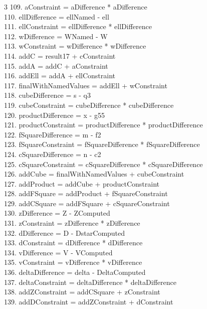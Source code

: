 \documentclass[10pt]{article}
\begin{document}
\begin{multicols}{3}
109. aConstraint = aDifference * aDifference\\
110. ellDifference = ellNamed - ell\\
111. ellConstraint = ellDifference * ellDifference\\
112. wDifference = WNamed - W\\
113. wConstraint = wDifference * wDifference\\
114. addC = result17 + cConstraint\\
115. addA = addC + aConstraint\\
116. addEll = addA + ellConstraint\\
117. finalWithNamedValues = addEll + wConstraint\\
118. cubeDifference = s - q3\\
119. cubeConstraint = cubeDifference * cubeDifference\\
120. productDifference = x - g55\\
121. productConstraint = productDifference * productDifference\\
122. fSquareDifference = m - f2\\
123. fSquareConstraint = fSquareDifference * fSquareDifference\\
124. cSquareDifference = n - c2\\
125. cSquareConstraint = cSquareDifference * cSquareDifference\\
126. addCube = finalWithNamedValues + cubeConstraint\\
127. addProduct = addCube + productConstraint\\
128. addFSquare = addProduct + fSquareConstraint\\
129. addCSquare = addFSquare + cSquareConstraint\\
130. zDifference = Z - ZComputed\\
131. zConstraint = zDifference * zDifference\\
132. dDifference = D - DstarComputed\\
133. dConstraint = dDifference * dDifference\\
134. vDifference = V - VComputed\\
135. vConstraint = vDifference * vDifference\\
136. deltaDifference = delta - DeltaComputed\\
137. deltaConstraint = deltaDifference * deltaDifference\\
138. addZConstraint = addCSquare + zConstraint\\
139. addDConstraint = addZConstraint + dConstraint\\

\end{multicols}
\end{document}
